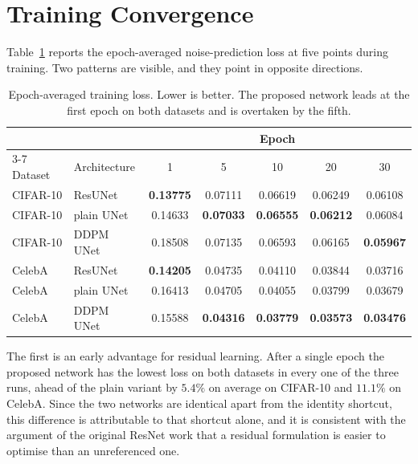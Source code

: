 \section{Training Convergence}
\label{sec:convergence}

Table~\ref{tab:loss} reports the epoch-averaged noise-prediction loss at five points during
training. Two patterns are visible, and they point in opposite directions.

\begin{table}[htbp]
    \centering
    \caption{Epoch-averaged training loss. Lower is better. The proposed network leads at the first
    epoch on both datasets and is overtaken by the fifth.}
    \label{tab:loss}
    \begin{tabular}{llccccc}
        \toprule
        & & \multicolumn{5}{c}{Epoch} \\
        \cmidrule(lr){3-7}
        Dataset & Architecture & 1 & 5 & 10 & 20 & 30 \\
        \midrule
        CIFAR-10 & ResUNet    & \textbf{0.13775} & 0.07111 & 0.06619 & 0.06249 & 0.06108 \\
        CIFAR-10 & plain UNet & 0.14633 & \textbf{0.07033} & \textbf{0.06555} & \textbf{0.06212} &
        0.06084 \\
        CIFAR-10 & DDPM UNet  & 0.18508 & 0.07135 & 0.06593 & 0.06165 & \textbf{0.05967} \\
        \midrule
        CelebA   & ResUNet    & \textbf{0.14205} & 0.04735 & 0.04110 & 0.03844 & 0.03716 \\
        CelebA   & plain UNet & 0.16413 & 0.04705 & 0.04055 & 0.03799 & 0.03679 \\
        CelebA & DDPM UNet & 0.15588 & \textbf{0.04316} & \textbf{0.03779} & \textbf{0.03573} &
        \textbf{0.03476} \\
        \bottomrule
    \end{tabular}
\end{table}

The first is an early advantage for residual learning. After a single epoch the proposed network has
the lowest loss on both datasets in every one of the three runs, ahead of the plain variant by
$5.4\%$ on average on CIFAR-10 and $11.1\%$ on CelebA. Since the two networks are identical apart
from the identity shortcut, this difference is attributable to that shortcut alone, and it is
consistent with the argument of the original ResNet work that a residual formulation is easier to
optimise than an unreferenced one.

